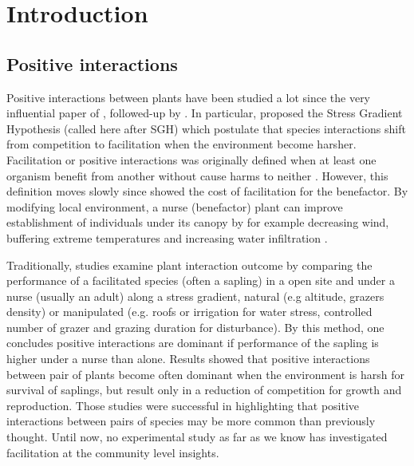 \documentclass[12pt]{article} %
\begin{document}
\section{Introduction}

\subsection{Positive interactions}
Positive interactions between plants have been studied a lot since the very influential paper of \citep{Bertness1994}, followed-up by \citep{Bruno2003}. In particular, \citet{Bertness1994} proposed the Stress Gradient Hypothesis (called here after SGH) which postulate that species interactions shift from competition to facilitation when the environment become harsher. Facilitation or positive interactions was originally defined when at least one organism benefit from another without cause harms to neither \citep{Bruno2003}. However, this definition moves slowly since \citet{Schob2014} showed the cost of facilitation for the benefactor.
By modifying local environment, a nurse (benefactor) plant can improve establishment of individuals under its canopy by for example decreasing wind, buffering extreme temperatures and increasing water infiltration \citep{Rietkerk1997}. 

Traditionally, studies examine plant interaction outcome by comparing the performance of a facilitated species (often a sapling) in a open site and under a nurse (usually an adult) along a stress gradient, natural (e.g altitude, grazers density) or manipulated (e.g. roofs or irrigation for water stress, controlled number of grazer and grazing duration for disturbance).
By this method, one concludes positive interactions are dominant if performance of the sapling is higher under a nurse than alone. Results showed that positive interactions between pair of plants become often dominant when the environment is harsh for survival of saplings, but result only in a reduction of competition for growth and reproduction\citep{He2013}.
Those studies were successful in highlighting that positive interactions between pairs of species may be more common than previously thought. Until now, no experimental study as far as we know has investigated facilitation at the community level insights. 
\end{document}
